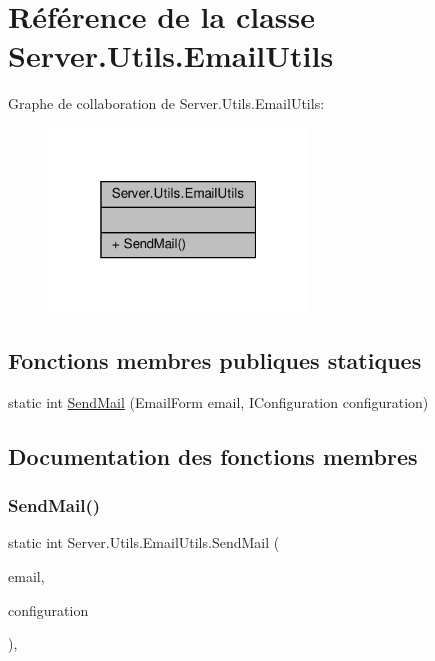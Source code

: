 \hypertarget{class_server_1_1_utils_1_1_email_utils}{}\section{Référence de la classe Server.\+Utils.\+Email\+Utils}
\label{class_server_1_1_utils_1_1_email_utils}


Graphe de collaboration de Server.\+Utils.\+Email\+Utils\+:
\nopagebreak
\begin{figure}[H]
\begin{center}
\leavevmode
\includegraphics[width=196pt]{class_server_1_1_utils_1_1_email_utils__coll__graph}
\end{center}
\end{figure}
\subsection*{Fonctions membres publiques statiques}
\begin{DoxyCompactItemize}
\item 
static int \hyperlink{class_server_1_1_utils_1_1_email_utils_a591df5a567a0dd54572bea9f007ab631}{Send\+Mail} (Email\+Form email, I\+Configuration configuration)
\end{DoxyCompactItemize}


\subsection{Documentation des fonctions membres}
\mbox{\label{class_server_1_1_utils_1_1_email_utils_a591df5a567a0dd54572bea9f007ab631}} 
\subsubsection{\texorpdfstring{Send\+Mail()}{SendMail()}}
{\footnotesize\ttfamily static int Server.\+Utils.\+Email\+Utils.\+Send\+Mail (\begin{DoxyParamCaption}\item[{Email\+Form}]{email,  }\item[{I\+Configuration}]{configuration }\end{DoxyParamCaption})\hspace{0.3cm}{\ttfamily [inline]}, {\ttfamily [static]}}






